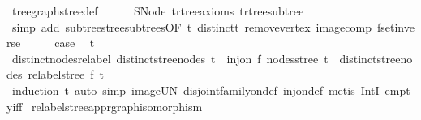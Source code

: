 \begin{isabellebody}
\ tree{\isacharunderscore}{\kern0pt}graph{\isacharunderscore}{\kern0pt}stree{\isacharunderscore}{\kern0pt}def\isanewline
\ \ \ \ \isamarkupfalse%
\ SNode\ t{\isachardot}{\kern0pt}rtree{\isacharunderscore}{\kern0pt}axioms\ t{\isachardot}{\kern0pt}rtree{\isacharunderscore}{\kern0pt}subtree\isanewline
\ \ \ \ \isamarkupfalse%
\ {\isacharparenleft}{\kern0pt}simp\ add{\isacharcolon}{\kern0pt}\ subtrees{\isacharunderscore}{\kern0pt}tree{\isacharunderscore}{\kern0pt}subtrees{\isacharbrackleft}{\kern0pt}OF\ t\ distinct{\isacharunderscore}{\kern0pt}t\ remove{\isacharunderscore}{\kern0pt}vertex{\isacharbrackright}{\kern0pt}\ image{\isacharunderscore}{\kern0pt}comp\ fset{\isacharunderscore}{\kern0pt}inverse{\isacharparenright}{\kern0pt}\isanewline
\ \ \isamarkupfalse%
\ \isamarkupfalse%
\ {\isacharquery}{\kern0pt}case\ \isamarkupfalse%
\ t\ \isacommand{{\isachardot}{\kern0pt}}\isamarkupfalse%
\isanewline
{}\isamarkupfalse%
%
\endisatagproof
{\isafoldproof}%
%
\isadelimproof
\isanewline
%
\endisadelimproof
\isanewline
{}\isamarkupfalse%
\ distinct{\isacharunderscore}{\kern0pt}nodes{\isacharunderscore}{\kern0pt}relabel{\isacharcolon}{\kern0pt}\ {\isachardoublequoteopen}distinct{\isacharunderscore}{\kern0pt}stree{\isacharunderscore}{\kern0pt}nodes\ t\ {\isasymLongrightarrow}\ inj{\isacharunderscore}{\kern0pt}on\ f\ {\isacharparenleft}{\kern0pt}nodes{\isacharunderscore}{\kern0pt}stree\ t{\isacharparenright}{\kern0pt}\ {\isasymLongrightarrow}\ distinct{\isacharunderscore}{\kern0pt}stree{\isacharunderscore}{\kern0pt}nodes\ {\isacharparenleft}{\kern0pt}relabel{\isacharunderscore}{\kern0pt}stree\ f\ t{\isacharparenright}{\kern0pt}{\isachardoublequoteclose}\isanewline
%
\isadelimproof
\ \ %
\endisadelimproof
%
\isatagproof
{}\isamarkupfalse%
\ {\isacharparenleft}{\kern0pt}induction\ t{\isacharparenright}{\kern0pt}\ {\isacharparenleft}{\kern0pt}auto\ simp{\isacharcolon}{\kern0pt}\ image{\isacharunderscore}{\kern0pt}UN\ disjoint{\isacharunderscore}{\kern0pt}family{\isacharunderscore}{\kern0pt}on{\isacharunderscore}{\kern0pt}def\ inj{\isacharunderscore}{\kern0pt}on{\isacharunderscore}{\kern0pt}def{\isacharcomma}{\kern0pt}\ metis\ IntI\ empty{\isacharunderscore}{\kern0pt}iff{\isacharparenright}{\kern0pt}%
\endisatagproof
{\isafoldproof}%
%
\isadelimproof
\isanewline
%
\endisadelimproof
\isanewline
{}\isamarkupfalse%
\ relabel{\isacharunderscore}{\kern0pt}stree{\isacharunderscore}{\kern0pt}app{\isacharunderscore}{\kern0pt}rgraph{\isacharunderscore}{\kern0pt}isomorphism{\isacharcolon}{\kern0pt}\isanewline

\end{isabellebody}
